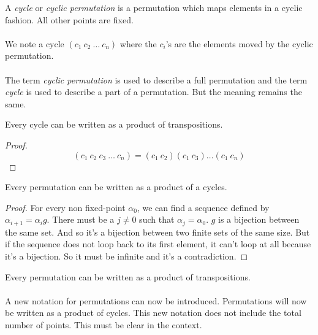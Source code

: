 \begin{definition}[Cycle]
  A \textit{cycle} or \textit{cyclic permutation} is a permutation which maps elements in a cyclic fashion. All other points are fixed.
\end{definition}

\paragraph{}
We note a cycle $(c_1\ c_2\ \dots\ c_n)$ where the $c_i$'s are the elements moved by the cyclic permutation.

\paragraph{}
The term \textit{cyclic permutation} is used to describe a full permutation and the term \textit{cycle} is used to describe a part of a permutation. But the meaning remains the same.

\begin{proposition}
  Every cycle can be written as a product of transpositions.
\end{proposition}

\begin{proof}
  \[
    (c_1\ c_2\ c_3\ \dots\ c_n) = (c_1\ c_2)(c_1\ c_3)\dots(c_1\ c_n)
  \]
\end{proof}

\begin{proposition}
  Every permutation can be written as a product of a cycles.
\end{proposition}

\begin{proof}
  For every non fixed-point $\alpha_0$, we can find a sequence defined by $\alpha_{i+1} = \alpha_i g$. There must be a $j \neq 0$ such that $\alpha_j = \alpha_0$. $g$ is a bijection between the same set. And so it's a bijection between two finite sets of the same size. But if the sequence does not loop back to its first element, it can't loop at all because it's a bijection. So it must be infinite and it's a contradiction.
\end{proof}

\begin{corollary}
  Every permutation can be written as a product of transpositions.
\end{corollary}

\paragraph{}
A new notation for permutations can now be introduced. Permutations will now be written as a product of cycles. This new notation does not include the total number of points. This must be clear in the context.

